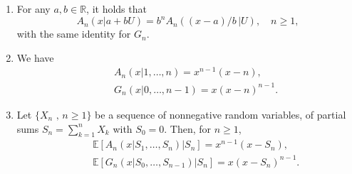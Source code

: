 \begin{prop}\label{prop:Appell_AG_polynomials_properties}
\begin{enumerate}
\item For any $a,b\in \mathbb{R}$, it holds that
\begin{equation}
A_{n}(x|a+bU) = b^n A_n\left((x-a)/b \, |U\right), \quad n\geq 1, \label{eq:LinearTransform}
\end{equation}
with the same identity for $G_n$.
\item We have 
\begin{eqnarray}
&&A_{n}(x|1,\ldots,n) = x^{n-1}(x-n), \label{eq:ExplicitExpressionIntAppellPolynomials}\\
&&G_{n}(x|0,\ldots,n-1)= x(x-n)^{n-1}.    \label{eq:ExplicitExpressionIntAGPolynomials}
\end{eqnarray}
\item Let $\{X_{n}\text{ , }n\geq1\}$ be a sequence of \iid nonnegative random variables, of partial sums $S_{n}=\sum_{k=1}^{n}X_{k}$ with $S_0=0$. Then, for $n\geq 1$,
\begin{eqnarray}
&&\mathbb{E} \left[A_{n}(x|S_{1},\ldots,S_{n})\vert S_{n}\right] = x^{n-1}(x-S_{n}), \label{eq:ExplicitExpressionPartialSumsAppellPolynomials}\\
&&\mathbb{E}\left[G_{n}(x|S_{0},\ldots,S_{n-1})\vert S_{n}\right] = x(x-S_{n})^{n-1}.    \label{eq:ExplicitExpressionPartialSumsAGPolynomials}
\end{eqnarray}
\end{enumerate} 
\end{prop}
